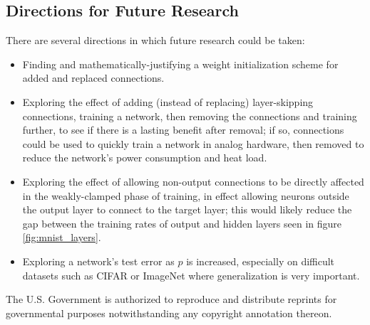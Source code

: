 \documentclass[format=sigconf]{acmart}
\begin{document}
\subsection{Directions for Future Research}

There are several directions in which future research could be taken:
\begin{itemize} 
\item Finding and mathematically-justifying a weight initialization scheme for added and replaced connections.
\item Exploring the effect of adding (instead of replacing) layer-skipping connections, training a network, then removing the connections and training further, to see if there is a lasting benefit after removal; if so, connections could be used to quickly train a network in analog hardware, then removed to reduce the network's power consumption and heat load. 
\item Exploring the effect of allowing non-output connections to be directly affected in the weakly-clamped phase of training, in effect allowing neurons outside the output layer to connect to the target layer; this would likely reduce the gap between the training rates of output and hidden layers seen in figure \ref{fig:mnist_layers}. 
\item Exploring a network's test error as $p$ is increased, especially on difficult datasets such as CIFAR or ImageNet where generalization is very important.
\end{itemize}




The U.S. Government is authorized to reproduce and distribute reprints for governmental purposes notwithstanding any copyright annotation thereon.



\end{document}
